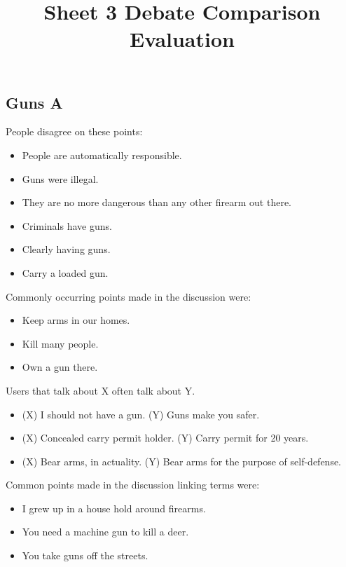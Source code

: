 \documentclass[tikz]{article}
\title{\textbf{Sheet 3} Debate Comparison Evaluation\vspace{-9ex}}
\date{}
\begin{document}
  \maketitle

  \begin{multicols}{2}
    \subsection*{Guns A}
    People disagree on these points:
    \begin{itemize}[noitemsep,nolistsep,label={}]
		\item{People are automatically responsible.}
		\item{Guns were illegal.}
		\item{They are no more dangerous than any other firearm out there.}
		\item{Criminals have guns.}
		\item{Clearly having guns.}
		\item{Carry a loaded gun.}
    \end{itemize}

    Commonly occurring points made in the discussion were:
    \begin{itemize}[noitemsep,nolistsep,label={}]
		\item{Keep arms in our homes.}
		\item{Kill many people.}
		\item{Own a gun there.}
    \end{itemize}

    Users that talk about X often talk about Y.
    \begin{itemize}[noitemsep,nolistsep,label={}]
		\item{(X) I should not have a gun. (Y) Guns make you safer.}
		\item{(X) Concealed carry permit holder. (Y) Carry permit for 20 years.}
		\item{(X) Bear arms, in actuality. (Y) Bear arms for the purpose of self-defense.}
    \end{itemize}

    Common points made in the discussion linking terms were:
    \begin{itemize}[noitemsep,nolistsep,label={}]
		\item{I grew up in a house hold around firearms.}
		\item{You need a machine gun to kill a deer.}
		\item{You take guns off the streets.}
    \end{itemize}


\end{multicols}
\end{document}
